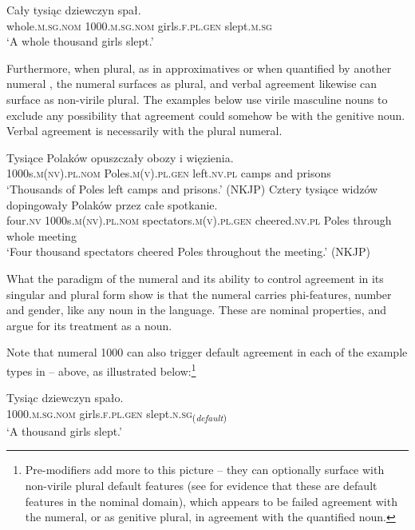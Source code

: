 \documentclass[output=paper]{langscibook}
\begin{document}
\ea\label{klo:ex:sg1000}
\gll Cały tysiąc dziewczyn spał.\\
whole.\textsc{m.sg.nom} 1000.\textsc{m.sg.nom} girls.\textsc{f.pl.gen} slept.\textsc{m.sg}\\
\glt `A whole thousand girls slept.'
\z

\noindent Furthermore, when plural, as in approximatives  or when quantified by another numeral , the numeral surfaces as plural, and verbal agreement likewise can surface as non-virile plural. The examples below use virile masculine nouns to exclude any possibility that agreement could somehow be with the genitive noun. Verbal agreement is necessarily with the plural numeral.

\ea \label{klo:ex:plural1000}
\ea \label{klo:ex:approx1000}
\gll Tysiące Polaków opuszczały obozy i więzienia.\\
1000s.\textsc{m(nv).pl.nom} Poles.\textsc{m(v).pl.gen} left.\textsc{nv.pl} camps and prisons\\
\glt `Thousands of Poles left camps and prisons.' \hfill (NKJP)
\ex  \gll Cztery tysiące widzów dopingowały Polaków przez całe spotkanie. \\
four.\textsc{nv} 1000s.\textsc{m(nv).pl.nom} spectators.\textsc{m(v).pl.gen} cheered.\textsc{nv.pl} Poles through whole meeting\\
\glt `Four thousand spectators cheered Poles throughout the meeting.' \label{klo:ex:quant1000} \hfill (NKJP)
\z \z %

\noindent What the paradigm of the numeral and its ability to control agreement in its singular and plural form show is that the numeral carries phi-features, number and gender, like any noun in the language. These are nominal properties, and argue for its treatment as a noun. 

Note that numeral 1000 can also trigger default agreement in each of the example types in -- above, as illustrated below:\footnote{Pre-modifiers add more to this picture -- they can optionally surface with non-virile plural default features (see \citealt[121--122]{klockmann2017semiLex} for evidence that these are default features in the nominal domain), which appears to be failed agreement with the numeral, or as genitive plural, in agreement with the quantified noun.}

\ea\label{klo:ex:defagr1000}
\gll Tysiąc dziewczyn spało.\\
1000.\textsc{m.sg.nom} girls.\textsc{f.pl.gen} slept.\textsc{n.sg}\textsubscript{(\textit{default})}\\
\glt `A thousand girls slept.'
\z
\end{document}
